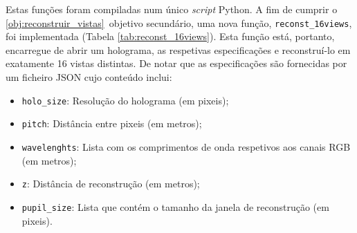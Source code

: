 
Estas funções foram compiladas num único \textit{script} Python. A fim de cumprir o \ref{obj:reconstruir_vistas}\textordmasculine~objetivo secundário, uma nova função, \verb|reconst_16views|, foi implementada (Tabela \ref{tab:reconst_16views}). Esta função está, portanto, encarregue de abrir um holograma, as respetivas especificações e reconstruí-lo em exatamente 16 vistas distintas. De notar que as especificações são fornecidas por um ficheiro JSON cujo conteúdo inclui:
\begin{itemize}
    \item \verb|holo_size|: Resolução do holograma (em pixeis);
    \item \verb|pitch|: Distância entre pixeis (em metros);
    \item \verb|wavelenghts|: Lista com os comprimentos de onda respetivos aos canais \ac{RGB} (em metros);
    \item \verb|z|: Distância de reconstrução (em metros);
    \item \verb|pupil_size|: Lista que contém o tamanho da janela de reconstrução (em pixeis).
\end{itemize}

